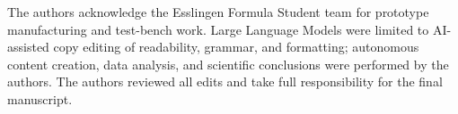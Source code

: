 The authors acknowledge the Esslingen Formula Student team for prototype
manufacturing and test-bench work.
Large Language Models were limited to AI-assisted copy editing of readability,
grammar, and formatting; autonomous content creation, data analysis, and
scientific conclusions were performed by the authors.
The authors reviewed all edits and take full responsibility for the final manuscript.
